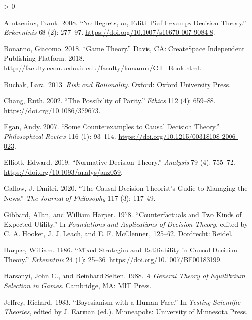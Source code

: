 \documentclass[
  12pt,
]{article}
\newlength{\cslhangindent}
\newenvironment{CSLReferences}[2] %
 {%
  \setlength{\parindent}{0pt}
  \ifodd #1 \everypar{\setlength{\hangindent}{\cslhangindent}}\ignorespaces\fi
  \ifnum #2 > 0
  \setlength{\parskip}{#2\baselineskip}
  \fi
 }%
 {}
\begin{document}
\begin{CSLReferences}{1}{0}
\leavevmode\hypertarget{ref-Arntzenius2008}{}%
Arntzenius, Frank. 2008. {``No Regrets; or, Edith Piaf Revamps Decision
Theory.''} \emph{Erkenntnis} 68 (2): 277--97.
\url{https://doi.org/10.1007/s10670-007-9084-8}.

\leavevmode\hypertarget{ref-Bonanno2018}{}%
Bonanno, Giacomo. 2018. {``Game Theory.''} Davis, CA: CreateSpace
Independent Publishing Platform. 2018.
\url{http://faculty.econ.ucdavis.edu/faculty/bonanno/GT_Book.html}.

\leavevmode\hypertarget{ref-BuchakRisk}{}%
Buchak, Lara. 2013. \emph{Risk and Rationality}. Oxford: Oxford
University Press.

\leavevmode\hypertarget{ref-Chang2002}{}%
Chang, Ruth. 2002. {``The Possibility of Parity.''} \emph{Ethics} 112
(4): 659--88. \url{https://doi.org/10.1086/339673}.

\leavevmode\hypertarget{ref-Egan2007-EGASCT}{}%
Egan, Andy. 2007. {``{Some Counterexamples to Causal Decision
Theory}.''} \emph{Philosophical Review} 116 (1): 93--114.
\url{https://doi.org/10.1215/00318108-2006-023}.

\leavevmode\hypertarget{ref-Elliot2019}{}%
Elliott, Edward. 2019. {``Normative Decision Theory.''} \emph{Analysis}
79 (4): 755--72. \url{https://doi.org/10.1093/analys/anz059}.

\leavevmode\hypertarget{ref-Gallow2020}{}%
Gallow, J. Dmitri. 2020. {``The Causal Decision Theorist's Gudie to
Managing the News.''} \emph{The Journal of Philosophy} 117 (3): 117--49.

\leavevmode\hypertarget{ref-GibbardHarper1978}{}%
Gibbard, Allan, and William Harper. 1978. {``Counterfactuals and Two
Kinds of Expected Utility.''} In \emph{Foundations and Applications of
Decision Theory}, edited by C. A. Hooker, J. J. Leach, and E. F.
McClennen, 125--62. Dordrecht: Reidel.

\leavevmode\hypertarget{ref-Harper1986}{}%
Harper, William. 1986. {``Mixed Strategies and Ratifiability in Causal
Decision Theory.''} \emph{Erkenntnis} 24 (1): 25--36.
\url{https://doi.org/10.1007/BF00183199}.

\leavevmode\hypertarget{ref-HarsanyiSelten1988}{}%
Harsanyi, John C., and Reinhard Selten. 1988. \emph{A General Theory of
Equilibrium Selection in Games}. Cambridge, MA: {MIT} Press.

\leavevmode\hypertarget{ref-Jeffrey1983}{}%
Jeffrey, Richard. 1983. {``Bayesianism with a Human Face.''} In
\emph{Testing Scientific Theories}, edited by J. Earman (ed.).
Minneapolis: University of Minnesota Press.


\end{CSLReferences}
\end{document}
